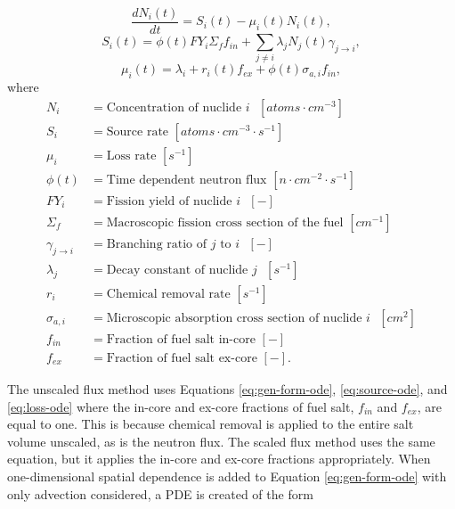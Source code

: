 \documentclass{style/nseJournal}
\begin{document}
\begin{equation}
    \frac{d N_i (t)}{d t} = S_i(t) - \mu_i(t) N_i(t),
\label{eq:gen-form-ode}
\end{equation}
\begin{equation}
    S_i(t) = \phi(t) FY_i \Sigma_f f_{in} + \sum_{j \ne i} \lambda_j N_j(t) \gamma_{j \rightarrow i},
    \label{eq:source-ode}
\end{equation}
\begin{equation}
    \mu_i(t) = \lambda_i + r_i(t) f_{ex} + \phi(t) \sigma_{a, i} f_{in},
    \label{eq:loss-ode}
\end{equation}
where
\begin{align}
    N_i &= \text{Concentration of nuclide $i$ $[atoms \cdot cm^{-3}]$} \nonumber\\
    S_i &= \text{Source rate $[atoms \cdot cm^{-3} \cdot s^{-1}]$} \nonumber\\
    \mu_i &= \text{Loss rate $[s^{-1}]$} \nonumber\\
    \phi(t) &= \text{Time dependent neutron flux $[n \cdot cm^{-2} \cdot s^{-1}]$} \nonumber \\
    FY_i &= \text{Fission yield of nuclide $i$ $[-]$} \nonumber\\
    \Sigma_f &= \text{Macroscopic fission cross section of the fuel $[cm^{-1}]$} \nonumber \\
    \gamma_{j \rightarrow i} &= \text{Branching ratio of $j$ to $i$ $[-]$} \nonumber\\
    \lambda_j &= \text{Decay constant of nuclide $j$ $[s^{-1}]$} \nonumber \\
    r_i &= \text{Chemical removal rate $[s^{-1}]$} \nonumber \\
    \sigma_{a, i} &= \text{Microscopic absorption cross section of nuclide $i$ $[cm^2]$} \nonumber \\
    f_{in} &= \text{Fraction of fuel salt in-core $[-]$} \nonumber\\
    f_{ex} &= \text{Fraction of fuel salt ex-core $[-]$}.
\end{align}

The unscaled flux method uses Equations \eqref{eq:gen-form-ode}, \eqref{eq:source-ode}, and \eqref{eq:loss-ode} where the in-core and ex-core fractions of fuel salt, $f_{in}$ and $f_{ex}$, are equal to one. This is because chemical removal is applied to the entire salt volume unscaled, as is the neutron flux.
The scaled flux method uses the same equation, but it applies the in-core and ex-core fractions appropriately.
When one-dimensional spatial dependence is added to Equation \eqref{eq:gen-form-ode} with only advection considered, a PDE is created of the form
\end{document}
